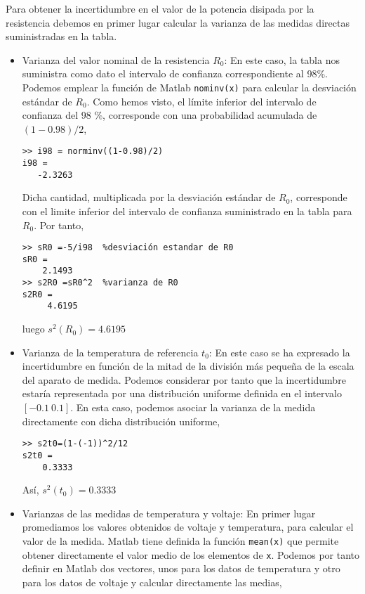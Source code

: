 Para obtener la incertidumbre en el valor de la potencia disipada por la resistencia debemos en primer lugar calcular la varianza de las medidas directas suministradas en la tabla.

\begin{itemize} 

\item Varianza del valor nominal de la resistencia $R_0$: En este caso, la tabla nos suministra como dato el intervalo de confianza correspondiente al 98\%.  Podemos emplear la función de Matlab \texttt{nominv(x)} para calcular la desviación estándar de $R_0$. Como hemos visto, el límite inferior del intervalo de confianza del 98 \%, corresponde con una probabilidad acumulada de $(1-0.98)/2$,
\begin{verbatim}
>> i98 = norminv((1-0.98)/2)
i98 =
   -2.3263
\end{verbatim} 

Dicha cantidad, multiplicada por la desviación estándar de $R_0$, corresponde con el limite inferior del intervalo de confianza suministrado en la tabla  para $R_0$. Por tanto,

\begin{verbatim}
>> sR0 =-5/i98  %desviación estandar de R0
sR0 =
    2.1493
>> s2R0 =sR0^2  %varianza de R0
s2R0 =
     4.6195
\end{verbatim}

luego $s^2(R_0)= 4.6195$

\item Varianza de la temperatura de referencia $t_0$: En este caso se ha expresado la incertidumbre en función de la mitad de la división más pequeña de la escala del aparato de medida. Podemos considerar por tanto que la incertidumbre estaría representada por una distribución uniforme definida en el intervalo $[-0.1\ 0.1]$. En esta caso, podemos asociar la varianza de la medida directamente con dicha distribución uniforme, 

\begin{verbatim}
>> s2t0=(1-(-1))^2/12
s2t0 =
    0.3333
\end{verbatim}

Así, $s^2(t_0)=0.3333$

\item Varianzas de las medidas de temperatura y voltaje:
En primer lugar promediamos los valores  obtenidos de voltaje y temperatura, para calcular el valor de la medida. Matlab tiene definida la función \texttt{mean(x)} que permite obtener directamente el valor medio de los elementos de \texttt{x}. Podemos por tanto definir en Matlab dos vectores, unos para los datos de temperatura y otro para los datos de voltaje y calcular directamente las medias,


\end{itemize}
